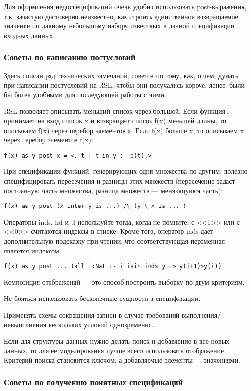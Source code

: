 \documentclass[14pt, twoside]{extreport}
\newcommand{\head}[1]{\vspace{1cm}\subsubsection*{#1}}
\begin{document}
Для оформления недоспецификаций очень удобно использовать post-выражения, т.к. зачастую достоверно неизвестно, как строить единственное возвращаемое значение по данному небольшому набору известных в данной спецификации входных данных.


\head{Советы по написанию постусловий}

Здесь описан ряд технических замечаний, советов по тому, как, о чем, думать при написании постусловий на RSL, чтобы они получались короче, яснее, были бы более удобными для последующей работы с ними.

RSL позволяет описывать меньший список через большой. Если функция f принимает на вход список x и возвращает список f(x) меньшей длины, то описываем f(x) через перебор элементов х. Если f(x) больше x, то описываем x через перебор элементов f(x):
\begin{lstlisting}
f(x) as y post x = <. t | t in y :- p(t).>
\end{lstlisting}

При спецификации функций, генерирующих одни множества по другим, полезно специфицировать пересечения и разницы этих множеств (пересечение задаст постоянную часть множества, разница множеств --- меняющуюся часть):
\begin{lstlisting}
f(x) as y post (x inter y is ...) /\ (y \ x is ... )
\end{lstlisting}

Операторы inds, hd и tl используйте тогда, когда не помните, с <<1>> или с <<0>> считаются индексы в списке. Кроме того, оператор inds дает дополнительную подсказку при чтении, что соответствующая переменная является индексом:
\begin{lstlisting}
f(x) as y post ... (all i:Nat :- i isin inds y => y(i+1)>y(i))
\end{lstlisting}

Композиция отображений --- это способ построить выборку по двум критериям.

Не бояться использовать бесконечные сущности в спецификации.

Применять схемы сокращения записи в случае требований выполнения/невыполнения нескольких условий одновременно.

Если для структуры данных нужно делать поиск и добавление в нее новых данных, то для ее моделирования лучше всего использовать отображение. Критерий поиска становится ключом, а добавляемые элементы --- значениями.

\head{Советы по получению понятных спецификаций}
\end{document}

